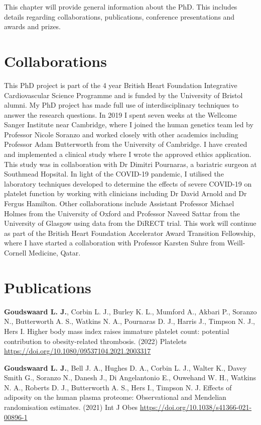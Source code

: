 \documentclass[11pt,twoside]{bristolthesis}
\begin{document}
This chapter will provide general information about the PhD. This includes details regarding collaborations, publications, conference presentations and awards and prizes.

\hypertarget{collaborations}{%
\section{Collaborations}\label{collaborations}}

This PhD project is part of the 4 year British Heart Foundation Integrative Cardiovascular Science Programme and is funded by the University of Bristol alumni. My PhD project has made full use of interdisciplinary techniques to answer the research questions. In 2019 I spent seven weeks at the Wellcome Sanger Institute near Cambridge, where I joined the human genetics team led by Professor Nicole Soranzo and worked closely with other academics including Professor Adam Butterworth from the University of Cambridge. I have created and implemented a clinical study where I wrote the approved ethics application. This study was in collaboration with Dr Dimitri Pournaras, a bariatric surgeon at Southmead Hopsital. In light of the COVID-19 pandemic, I utilised the laboratory techniques developed to determine the effects of severe COVID-19 on platelet function by working with clinicians including Dr David Arnold and Dr Fergus Hamilton. Other collaborations include Assistant Professor Michael Holmes from the University of Oxford and Professor Naveed Sattar from the University of Glasgow using data from the DiRECT trial. This work will continue as part of the British Heart Foundation Accelerator Award Transition Fellowship, where I have started a collaboration with Professor Karsten Suhre from Weill-Cornell Medicine, Qatar.

\hypertarget{publications}{%
\section{Publications}\label{publications}}

\textbf{Goudswaard L. J.}, Corbin L. J., Burley K. L., Mumford A., Akbari P., Soranzo N., Butterworth A. S., Watkins N. A., Pournaras D. J., Harris J., Timpson N. J., Hers I. Higher body mass index raises immature platelet count: potential contribution to obesity-related thrombosis. (2022) Platelets \url{https://doi.org/10.1080/09537104.2021.2003317}

\textbf{Goudswaard L. J.}, Bell J. A., Hughes D. A., Corbin L. J., Walter K., Davey Smith G., Soranzo N., Danesh J., Di Angelantonio E., Ouwehand W. H., Watkins N. A., Roberts D. J., Butterworth A. S., Hers I., Timpson N. J. Effects of adiposity on the human plasma proteome: Observational and Mendelian randomisation estimates. (2021) Int J Obes \url{https://doi.org/10.1038/s41366-021-00896-1}
\end{document}
